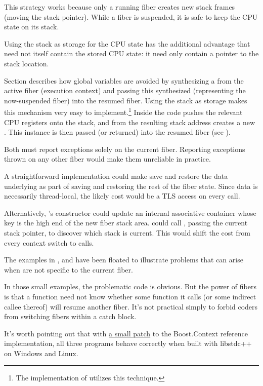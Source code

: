 This strategy works because only a running fiber creates new stack frames
(moving the stack pointer). While a fiber is suspended, it is safe to keep the
CPU state on its stack.

Using the stack as storage for the CPU state has the additional advantage
that \fiber need not itself contain the stored CPU state: it need only contain
a pointer to the stack location.

Section  describes how global variables are avoided
by synthesizing a \fiber from the active fiber (execution context) and passing
this synthesized \fiber (representing the now-suspended fiber) into the resumed
fiber. Using the stack as storage makes this mechanism very easy to
implement.\footnote{The implementation of \bcontext\cite{bcontext} utilizes this
technique.}
Inside \resume the code pushes the relevant CPU registers onto the stack, and
from the resulting stack address creates a new \fiber. This instance is then
passed (or returned) into the resumed fiber (see ).


\abschnitt{\exfns}\label{exc_scope}

Both \exfns must report exceptions solely on the current fiber.
Reporting exceptions thrown on any other fiber would make them
unreliable in practice.

A straightforward implementation could make \allresume save and restore the
data underlying \exfns as part of saving and restoring the rest of the fiber
state. Since \exfns data is necessarily thread-local, the likely cost would be
a TLS access on every \anyresume call.

Alternatively, \fiber's constructor could update an internal associative
container whose key is the high end of the new fiber stack area. \exfns could
call , passing the current stack pointer, to discover
which stack is current. This would shift the cost from every context switch
to \exfns calls.

The examples in ,  and
 have been floated to illustrate problems that can
arise when \exfns are not specific to the current fiber.

In those small examples, the problematic code is obvious. But the power of
fibers is that a function need not know whether some function it calls (or
some indirect callee thereof) will resume another fiber. It's not practical
simply to forbid coders from switching fibers within a catch block.

It's worth pointing out that with
\href{https://github.com/secondlife/3p-boost/blob/nat/exstate/patches/libs/context/0001-switch-exception-state.patch}{a small patch}
to the Boost.Context reference implementation, all three programs behave
correctly when built with libstdc++ on Windows and Linux.
